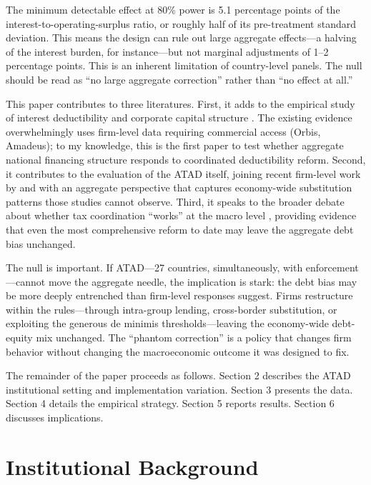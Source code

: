 \documentclass[12pt]{article}
\begin{document}
The minimum detectable effect at 80\% power is 5.1 percentage points of the interest-to-operating-surplus ratio, or roughly half of its pre-treatment standard deviation. This means the design can rule out large aggregate effects---a halving of the interest burden, for instance---but not marginal adjustments of 1--2 percentage points. This is an inherent limitation of country-level panels. The null should be read as ``no large aggregate correction'' rather than ``no effect at all.''

This paper contributes to three literatures. First, it adds to the empirical study of interest deductibility and corporate capital structure \citep{graham2000tax, blouin2014thin, buettner2012impact, de2012tax, schepens2016taxes}. The existing evidence overwhelmingly uses firm-level data requiring commercial access (Orbis, Amadeus); to my knowledge, this is the first paper to test whether aggregate national financing structure responds to coordinated deductibility reform. Second, it contributes to the evaluation of the ATAD itself, joining recent firm-level work by \citet{clifford2021tax} and \citet{gundert2023anti} with an aggregate perspective that captures economy-wide substitution patterns those studies cannot observe. Third, it speaks to the broader debate about whether tax coordination ``works'' at the macro level \citep{keen2006need, devereux2008debate}, providing evidence that even the most comprehensive reform to date may leave the aggregate debt bias unchanged.

The null is important. If ATAD---27 countries, simultaneously, with enforcement---cannot move the aggregate needle, the implication is stark: the debt bias may be more deeply entrenched than firm-level responses suggest. Firms restructure within the rules---through intra-group lending, cross-border substitution, or exploiting the generous de minimis thresholds---leaving the economy-wide debt-equity mix unchanged. The ``phantom correction'' is a policy that changes firm behavior without changing the macroeconomic outcome it was designed to fix.

The remainder of the paper proceeds as follows. Section 2 describes the ATAD institutional setting and implementation variation. Section 3 presents the data. Section 4 details the empirical strategy. Section 5 reports results. Section 6 discusses implications.


\section{Institutional Background}
\end{document}
